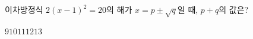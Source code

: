 이차방정식 $2(x-1)^2=20$의 해가 $x=p\pm\sqrt{q}$일 때, $p+q$의 값은? 
\begin{choices32}{$9$}{$10$}{$11$}{$12$}{$13$}\end{choices32}
